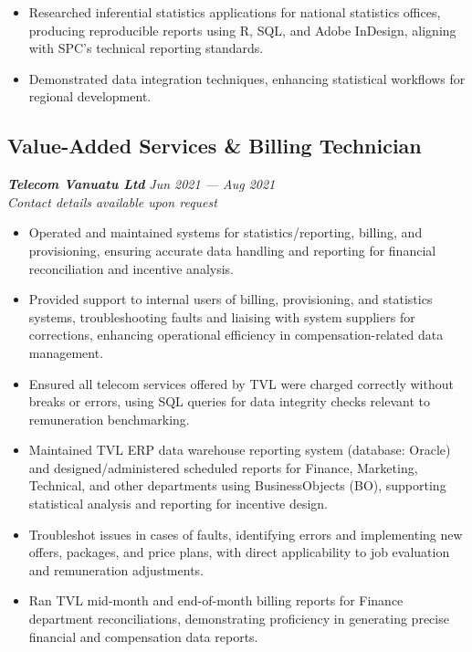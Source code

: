 \documentclass[
  letterpaper,
  DIV=11,
  numbers=noendperiod]{scrartcl}
\providecommand{\tightlist}{%
  \setlength{\itemsep}{0pt}\setlength{\parskip}{0pt}}
\begin{document}
\begin{itemize}
\tightlist
\item
  Researched inferential statistics applications for national statistics
  offices, producing reproducible reports using R, SQL, and Adobe
  InDesign, aligning with SPC's technical reporting standards.
\item
  Demonstrated data integration techniques, enhancing statistical
  workflows for regional development.
\end{itemize}

\subsection{Value-Added Services \& Billing
Technician}\label{value-added-services-billing-technician}

\textbf{\emph{Telecom Vanuatu Ltd}} {\emph{Jun 2021 --- Aug 2021}}\\
\emph{Contact details available upon request}

\begin{itemize}
\tightlist
\item
  Operated and maintained systems for statistics/reporting, billing, and
  provisioning, ensuring accurate data handling and reporting for
  financial reconciliation and incentive analysis.
\item
  Provided support to internal users of billing, provisioning, and
  statistics systems, troubleshooting faults and liaising with system
  suppliers for corrections, enhancing operational efficiency in
  compensation-related data management.
\item
  Ensured all telecom services offered by TVL were charged correctly
  without breaks or errors, using SQL queries for data integrity checks
  relevant to remuneration benchmarking.
\item
  Maintained TVL ERP data warehouse reporting system (database: Oracle)
  and designed/administered scheduled reports for Finance, Marketing,
  Technical, and other departments using BusinessObjects (BO),
  supporting statistical analysis and reporting for incentive design.
\item
  Troubleshot issues in cases of faults, identifying errors and
  implementing new offers, packages, and price plans, with direct
  applicability to job evaluation and remuneration adjustments.
\item
  Ran TVL mid-month and end-of-month billing reports for Finance
  department reconciliations, demonstrating proficiency in generating
  precise financial and compensation data reports.
\end{itemize}
\end{document}
